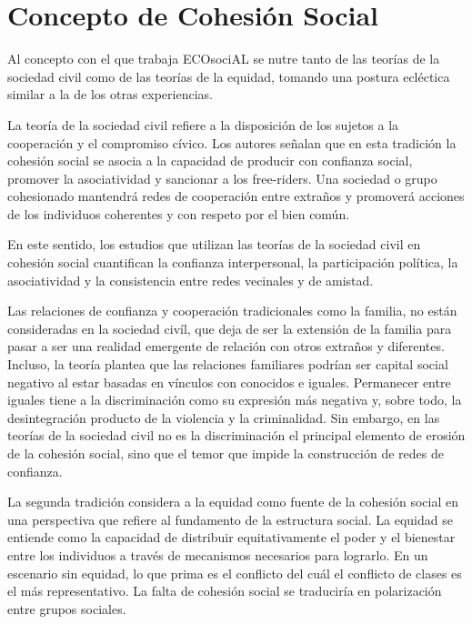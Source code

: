 \documentclass[
  12pt,
]{book}
\begin{document}
\hypertarget{concepto-de-cohesiuxf3n-social-4}{%
\section{Concepto de Cohesión Social}\label{concepto-de-cohesiuxf3n-social-4}}

Al concepto con el que trabaja ECOsociAL se nutre tanto de las teorías
de la sociedad civil como de las teorías de la equidad, tomando una
postura ecléctica similar a la de los otras experiencias.

La teoría de la sociedad civil refiere a la disposición de los sujetos a
la cooperación y el compromiso cívico. Los autores señalan que en esta
tradición la cohesión social se asocia a la capacidad de producir con
confianza social, promover la asociatividad y sancionar a los
free-riders. Una sociedad o grupo cohesionado mantendrá redes de
cooperación entre extraños y promoverá acciones de los individuos
coherentes y con respeto por el bien común.

En este sentido, los estudios que utilizan las teorías de la sociedad
civil en cohesión social cuantifican la confianza interpersonal, la
participación política, la asociatividad y la consistencia entre redes
vecinales y de amistad.

Las relaciones de confianza y cooperación tradicionales como la familia,
no están consideradas en la sociedad civíl, que deja de ser la extensión
de la familia para pasar a ser una realidad emergente de relación con
otros extraños y diferentes. Incluso, la teoría plantea que las
relaciones familiares podrían ser capital social negativo al estar
basadas en vínculos con conocidos e iguales. Permanecer entre iguales
tiene a la discriminación como su expresión más negativa y, sobre todo,
la desintegración producto de la violencia y la criminalidad. Sin
embargo, en las teorías de la sociedad civil no es la discriminación el
principal elemento de erosión de la cohesión social, sino que el temor
que impide la construcción de redes de confianza.
\citep{valenzuela_Vinculos_2008}

La segunda tradición considera a la equidad como fuente de la cohesión
social en una perspectiva que refiere al fundamento de la estructura
social. La equidad se entiende como la capacidad de distribuir
equitativamente el poder y el bienestar entre los individuos a través de
mecanismos necesarios para lograrlo. En un escenario sin equidad, lo que
prima es el conflicto del cuál el conflicto de clases es el más
representativo. La falta de cohesión social se traduciría en
polarización entre grupos sociales.
\end{document}
